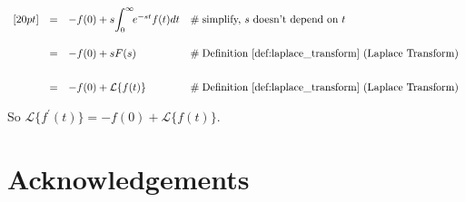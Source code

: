 \documentclass{article}
\theoremstyle{definition}
\begin{document}
\begin{equation*}
\begin{array}{lllll}
[20pt]
&=& -f(0) + s \mathlarger{\int}^\infty_0 \!  e^{-st}  f(t) dt                                                                                                                     &\mathrel{\#} \text{simplify, $s$ doesn't depend on $t$}                                          \\
[20pt]
&=& -f(0) + s F(s)                                                                                                                                                                              &\mathrel{\#} \text{Definition \ref{def:laplace_transform} (Laplace Transform)}       \\   
[20pt]
&=& -f(0) + \mathcal{L}\{f(t)\}                                                                                                                                                            &\mathrel{\#} \text{Definition \ref{def:laplace_transform} (Laplace Transform)}                                          
\end{array}
\end{equation*}

\bigskip
\noindent
So $\mathcal{L}\{f^\prime(t)\} = -f(0) + \mathcal{L}\{f(t)\}$.

\bigskip
\section*{Acknowledgements}

\newpage


\end{document}
